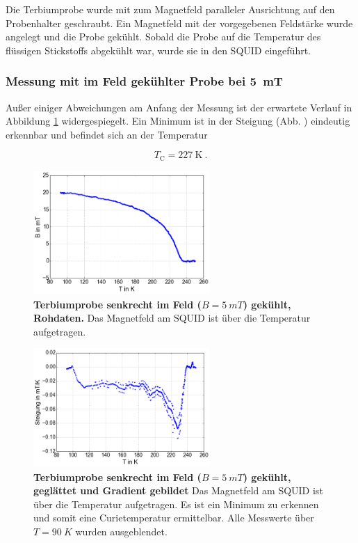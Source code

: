 \documentclass[a4paper,ngerman]{scrartcl}
\begin{document}
Die Terbiumprobe wurde mit zum Magnetfeld paralleler Ausrichtung auf den Probenhalter geschraubt. 
Ein Magnetfeld mit der vorgegebenen Feldstärke wurde angelegt und die Probe gekühlt.
Sobald die Probe auf die Temperatur des flüssigen Stickstoffs abgekühlt war,
wurde sie in den SQUID eingeführt.


\subsubsection*{Messung mit im Feld gekühlter Probe bei \SI{5}{mT}}

Außer einiger Abweichungen am Anfang der Messung ist der erwartete Verlauf in Abbildung \ref{fig:Tb_p_5} widergespiegelt.
Ein Minimum ist in der Steigung (Abb. ) eindeutig erkennbar und befindet sich an der Temperatur

\begin{equation}
T_{\mathrm{C}} = \SI{227}{\K} ~.
\end{equation}



\begin{figure}
\centering
\includegraphics[width=0.6\textwidth]{abbildungen/Tb_p_5.png}
\caption[Terbiumprobe parallel bei 5mT]{\textbf{Terbiumprobe senkrecht im Feld ($B = \SI{5}{mT}$) gekühlt, Rohdaten.} 
Das Magnetfeld am SQUID ist über die Temperatur aufgetragen. }
\label{fig:Tb_p_5}
\end{figure}

\begin{figure}
\centering
\includegraphics[width=0.6\textwidth]{abbildungen/Tb_p_5_grad.png}
\caption[Terbiumprobe parallel bei 5mT]{\textbf{Terbiumprobe senkrecht im Feld ($B = \SI{5}{mT}$) gekühlt, geglättet und Gradient gebildet} 
Das Magnetfeld am SQUID ist über die Temperatur aufgetragen. 
Es ist ein Minimum zu erkennen und somit eine Curietemperatur ermittelbar.
Alle Messwerte über $T =\SI{90}{K}$ wurden ausgeblendet.}
\label{fig:Tb_p_5_grad}
\end{figure}
\end{document}
